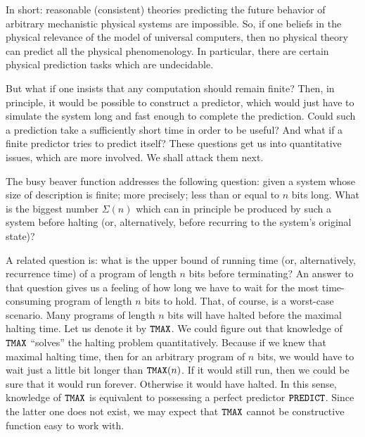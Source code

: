In short:  reasonable (consistent) theories predicting the future
behavior of arbitrary mechanistic physical systems are impossible.  So,
if one beliefs in the physical relevance of the model of universal
computers, then no physical theory can predict all the physical
phenomenology.  In particular, there are certain physical prediction
tasks which are undecidable.

But what if one insists that any computation should
remain finite? Then, in principle, it would be possible to construct a
predictor,
which would just have to simulate the system long and fast enough to
complete the prediction.
Could such a prediction take a sufficiently short time in order to be
useful? And what if a finite predictor tries to predict itself?
These questions get us into quantitative issues, which are more
involved. We shall attack them next.





The busy beaver function \cite{rado,chaitin-ACM} addresses the following
question: given a system whose  size of description is finite; more
precisely; less than or equal to
$n$ bits long. What is the biggest number $\Sigma (n)$ which can in
principle
be produced by such a system before halting (or, alternatively, before
recurring to the system's original state)?

A related question is: what is the upper bound of running time (or,
alternatively, recurrence time) of a program of length $n$ bits before
terminating?
An answer to that question gives us a feeling of how long we have to
wait for the most time-consuming program of length $n$ bits to
hold. That, of course, is a worst-case scenario. Many programs of
length $n$ bits will have halted before the maximal halting time.
Let us denote it by ${\tt TMAX}$.
We could figure out that knowledge of ${\tt TMAX}$
``solves'' the halting
problem quantitatively. Because if we knew that maximal halting
time,  then for an
arbitrary program of
$n$ bits,
we would have to wait
just a little bit longer than ${\tt TMAX}(n)$. If it would still run,
then we could be sure that it would run forever. Otherwise it would have
halted.
In this sense, knowledge of ${\tt TMAX}$ is equivalent to possessing a
perfect predictor ${\tt PREDICT}$. Since the latter one does not exist,
we may expect that ${\tt TMAX}$ cannot be constructive function easy to
work with.


